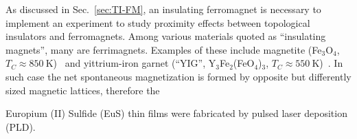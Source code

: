 As discussed in Sec.~\ref{sec:TI-FM}, an insulating ferromagnet is necessary to implement an experiment to study proximity effects between topological insulators and ferromagnets. Among various materials quoted as ``insulating magnets'', many are ferrimagnets. Examples of these include magnetite (Fe$_3$O$_4$, $T_C\approx850~\mathrm{K}$)~\cite{Neel1948} and yittrium-iron garnet (``YIG'', Y$_3$Fe$_2$(FeO$_4$)$_3$, $T_C\approx550~\mathrm{K}$)~\cite{YIG}. In such case the net spontaneous magnetization is formed by opposite but differently sized magnetic lattices, therefore the 

Europium (II) Sulfide (EuS) thin films were fabricated by pulsed laser deposition (PLD).